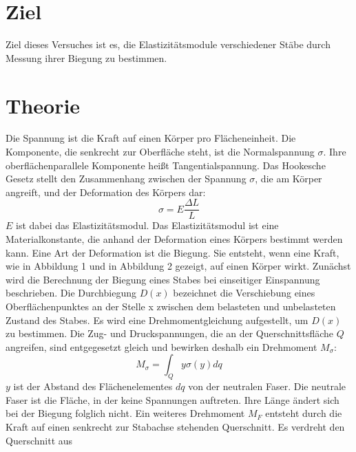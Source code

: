 

\maketitle
\tableofcontents
\newpage
\section{Ziel}
Ziel dieses Versuches ist es, die Elastizitätsmodule
verschiedener Stäbe durch Messung ihrer Biegung
zu bestimmen.
\section{Theorie}
Die Spannung ist die Kraft auf einen Körper pro Flächeneinheit.
Die Komponente, die senkrecht zur Oberfläche steht,
ist die Normalspannung $\sigma$. Ihre oberflächenparallele
Komponente heißt Tangentialspannung.
Das Hookesche Gesetz stellt den Zusammenhang zwischen
der Spannung $\sigma$, die am Körper angreift, und der
Deformation des Körpers dar:
\begin{equation}
\sigma = E \frac{\Delta L}{L}
\label{eqn:Hooke}
\end{equation}
$E$ ist dabei das Elastizitätsmodul.
Das Elastizitätsmodul ist eine Materialkonstante, die
anhand der Deformation eines Körpers bestimmt werden kann.
Eine Art der Deformation ist die Biegung. Sie entsteht, wenn
eine Kraft, wie in Abbildung 1 und in Abbildung 2 gezeigt, auf einen Körper wirkt. %
Zunächst wird die Berechnung der Biegung eines Stabes bei einseitiger
Einspannung beschrieben. %
Die Durchbiegung $D(x)$ bezeichnet die Verschiebung eines Oberflächenpunktes
an der Stelle x zwischen dem belasteten und unbelasteten Zustand des Stabes.
Es wird eine Drehmomentgleichung aufgestellt, um $D(x)$ zu bestimmen.
Die Zug- und Druckspannungen, die an der Querschnittsfläche $Q$ angreifen,
sind entgegesetzt gleich und bewirken deshalb ein Drehmoment $M_{\sigma}$:
\begin{equation*}
M_{\sigma} = \int_{Q} y \sigma(y) dq
\end{equation*}
$y$ ist der Abstand des Flächenelementes $dq$ von der neutralen
Faser. Die neutrale Faser ist die Fläche, in der keine Spannungen
auftreten. Ihre Länge ändert sich bei der Biegung folglich nicht.
Ein weiteres Drehmoment $M_{F}$ entsteht durch die Kraft auf einen senkrecht
zur Stabachse stehenden Querschnitt. Es verdreht den Querschnitt aus 

